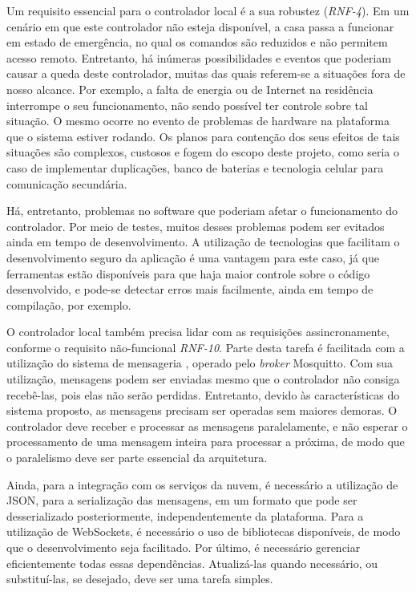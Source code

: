 Um requisito essencial para o controlador local é a sua robustez (\emph{RNF-4}). Em um cenário em que este controlador não esteja disponível, a casa passa a funcionar em estado de emergência, no qual os comandos são reduzidos e não permitem acesso remoto. Entretanto, há inúmeras possibilidades e eventos que poderiam causar a queda deste controlador, muitas das quais referem-se a situações fora de nosso alcance. Por exemplo, a falta de energia ou de Internet na residência interrompe o seu funcionamento, não sendo possível ter controle sobre tal situação. O mesmo ocorre no evento de problemas de hardware na plataforma que o sistema estiver rodando. Os planos para contenção dos seus efeitos de tais situações são complexos, custosos e fogem do escopo deste projeto, como seria o caso de implementar duplicações, banco de baterias e tecnologia celular para comunicação secundária.

Há, entretanto, problemas no software que poderiam afetar o funcionamento do controlador. Por meio de testes, muitos desses problemas podem ser evitados ainda em tempo de desenvolvimento. A utilização de tecnologias que facilitam o desenvolvimento seguro da aplicação é uma vantagem para este caso, já que ferramentas estão disponíveis para que haja maior controle sobre o código desenvolvido, e pode-se detectar erros mais facilmente, ainda em tempo de compilação, por exemplo.

O controlador local também precisa lidar com as requisições assincronamente, conforme o requisito não-funcional \emph{RNF-10}. Parte desta tarefa é facilitada com a utilização do sistema de mensageria \wmqtt{}, operado pelo \emph{broker} Mosquitto. Com sua utilização, mensagens podem ser enviadas mesmo que o controlador não consiga recebê-las, pois elas não serão perdidas. Entretanto, devido às características do sistema proposto, as mensagens precisam ser operadas sem maiores demoras. O controlador deve receber e processar as mensagens paralelamente, e não esperar o processamento de uma mensagem inteira para processar a próxima, de modo que o paralelismo deve ser parte essencial da arquitetura.

Ainda, para a integração com os serviços da nuvem, é necessário a utilização de JSON, para a serialização das mensagens, em um formato que pode ser desserializado posteriormente, independentemente da plataforma. Para a utilização de WebSockets, é necessário o uso de bibliotecas disponíveis, de modo que o desenvolvimento seja facilitado. Por último, é necessário gerenciar eficientemente todas essas dependências. Atualizá-las quando necessário, ou substituí-las, se desejado, deve ser uma tarefa simples.

